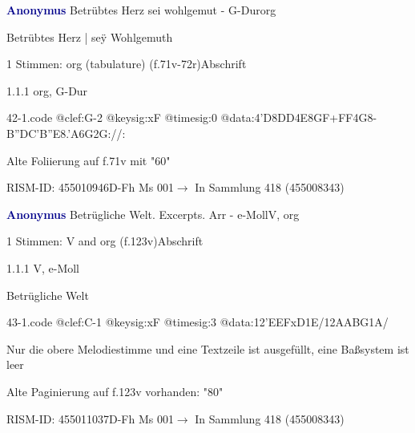 \documentclass[twocolumn, 12pt]{book}
\begin{document}
\par \vspace{16pt} \textcolor{darkblue}{\textbf{Anonymus  }}\hfillplus{\textbf{[42]}}\newline Betrübtes Herz sei wohlgemut - G-Dur\newline org
\par \begin{itshape}[f.71v, at left:] Betrübtes Herz | seÿ Wohlgemuth\end{itshape} 
\par \textcolor{darkblue}{}  1 Stimmen: org (tabulature)  (f.71v-72r)\newline Abschrift
\par 1.1.1  org, G-Dur  
\begin{filecontents*}{42-1.code}
@clef:G-2
@keysig:xF
@timesig:0
@data:4'D{8DD}4E{8GF+}{FF}4G8-{B''DC}{'B''E8.'A6G}2G://:
\end{filecontents*}
\newline %
\par Alte Foliierung auf f.71v mit "60"
\par RISM-ID: 455010946\newline D-Fh  Ms 001\newline $\rightarrow$ In Sammlung 418 (455008343)
      
\par \vspace{16pt} \textcolor{darkblue}{\textbf{Anonymus  }}\hfillplus{\textbf{[43]}}\newline Betrügliche Welt. Excerpts. Arr - e-Moll\newline V, org
\par \begin{itshape}\end{itshape} 
\par \textcolor{darkblue}{}  1 Stimmen: V and org  (f.123v)\newline Abschrift
\par 1.1.1  V, e-Moll\newline \begin{footnotesize} Betrügliche Welt \end{footnotesize}  
\begin{filecontents*}{43-1.code}
@clef:C-1
@keysig:xF
@timesig:3
@data:12'EEFxD1E/12AABG1A/
\end{filecontents*}
\newline %
\par Nur die obere Melodiestimme und eine Textzeile ist ausgefüllt, eine Baßsystem ist leer
\par Alte Paginierung auf f.123v vorhanden: "80"
\par RISM-ID: 455011037\newline D-Fh  Ms 001\newline $\rightarrow$ In Sammlung 418 (455008343)
      
\end{document}
